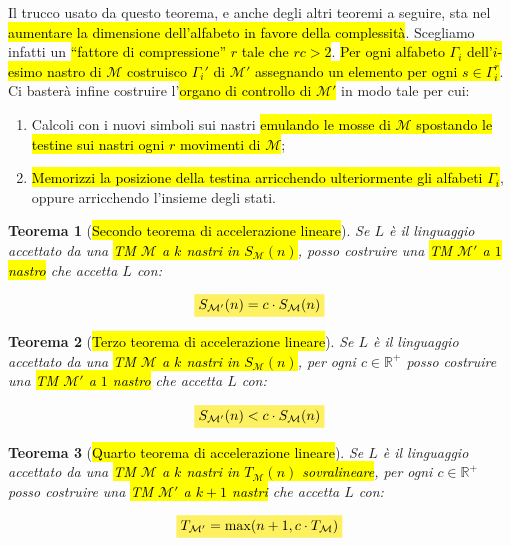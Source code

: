 \documentclass[a4paper,11pt,twoside]{article}
\theoremstyle{plain}
\newtheorem{thm}{Teorema}[section]
\theoremstyle{definition}
\theoremstyle{remark}
\newcommand{\mhl}[1]{\colorbox{hlcolor}{$\displaystyle #1$}}
\begin{document}
Il trucco usato da questo teorema, e anche degli altri teoremi a seguire, sta
nel \hl{aumentare la dimensione dell'alfabeto in favore della complessità}. Scegliamo
infatti un \hl{``fattore di compressione'' $r$ tale che $rc>2$}. \hl{Per ogni alfabeto
$\Gamma_i$ dell'$i$-esimo nastro di $\mathcal{M}$ costruisco $\Gamma_i'$ di
$\mathcal{M}'$ assegnando un elemento per ogni $s\in\Gamma_i^r$}. Ci basterà
infine costruire l'\hl{organo di controllo di $\mathcal{M}'$} in modo tale per cui:

\begin{enumerate}
  \item Calcoli con i nuovi simboli sui nastri \hl{emulando le mosse di
    $\mathcal{M}$ spostando le testine sui nastri ogni $r$ movimenti di
    $\mathcal{M}$};
  \item \hl{Memorizzi la posizione della testina arricchendo ulteriormente gli
    alfabeti $\Gamma_i$}, oppure arricchendo l'insieme degli stati.
\end{enumerate}

\begin{thm}[\hl{Secondo teorema di accelerazione lineare}]\label{thm:acc-lin-2}
  Se $L$ è il linguaggio accettato da una \hl{TM $\mathcal{M}$ a $k$ nastri in
  $S_\mathcal{M}(n)$}, posso costruire una \hl{TM $\mathcal{M}'$ a $1$ nastro}
  che accetta $L$ con:

  \begin{equation}
    \mhl{ S_{\mathcal{M}'}(n) = c \cdot S_\mathcal{M}(n) }
  \end{equation}
\end{thm}

\begin{thm}[\hl{Terzo teorema di accelerazione lineare}]\label{thm:acc-lin-3}
  Se $L$ è il linguaggio accettato da una \hl{TM $\mathcal{M}$ a $k$ nastri in
  $S_\mathcal{M}(n)$}, per ogni $c \in \mathbb{R}^+$ posso costruire una \hl{TM
  $\mathcal{M}'$ a $1$ nastro} che accetta $L$ con:

  \begin{equation}
    \mhl{ S_{\mathcal{M}'}(n) < c \cdot S_\mathcal{M}(n) }
  \end{equation}
\end{thm}

\begin{thm}[\hl{Quarto teorema di accelerazione lineare}]\label{thm:acc-lin-4}
  Se $L$ è il linguaggio accettato da una \hl{TM $\mathcal{M}$ a $k$ nastri in
  $T_\mathcal{M}(n)$ sovralineare}, per ogni $c \in \mathbb{R}^+$ posso
  costruire una \hl{TM $\mathcal{M}'$ a $k+1$ nastri} che accetta $L$ con:

  \begin{equation}
    \mhl{ T_{\mathcal{M}'} = \max(n+1, c\cdot T_\mathcal{M}) }
  \end{equation}
\end{thm}
\end{document}
